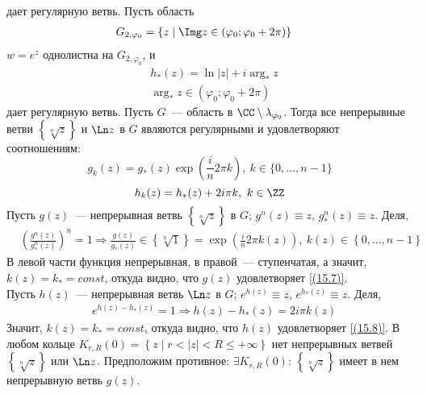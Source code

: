 дает регулярную ветвь.
Пусть область
\begin{align*}
  & G_{2, \varphi_0} = \left\{ z \mid \Img z \in \left( \varphi_0; \varphi_0 + 2\pi \right) \right\}
\end{align*}
$w = e^z$ однолистна на $G_{2, \varphi_0}$, и
\begin{equation}\label{(15.6)}
    \begin{split}
        & h_*(z) = \ln\left| z \right| + i \arg_* z \\
        & \arg_* z \in \left( \varphi_0; \varphi_0+2\pi \right)
    \end{split}
\end{equation}
дает регулярную ветвь.
\lemma
Пусть $G$~--- область в $\CC \setminus \lambda_{\varphi_0}$. Тогда все
непрерывные ветви $\left\{ \sqrt[n]{z} \right\}$ и $\Ln z$ в $G$ являются
регулярными и удовлетворяют соотношениям:
\begin{equation}\label{(15.7)}
    g_k(z) = g_*(z) \exp\left( \frac{i}{n} 2 \pi k\right), \ k \in \{0, \dots, n-1\}
\end{equation}
\begin{equation}\label{(15.8)}
    h_k(z) = h_*(z) + 2i \pi k, \ k \in \ZZ
\end{equation}
\pr
Пусть $g(z)$~--- непрерывная ветвь $\left\{\sqrt[n]{z}\right\}$ в $G$; $g^n(z) \equiv
    z$, $g_*^n(z) \equiv z$. Деля,
    \begin{align*}
      & \left( \frac{g^n(z)}{g_*^n(z)} \right)^n = 1 \Rightarrow \frac{g(z)}{g_*(z)} \in \left\{ \sqrt[n]{1} \right\} = \exp \left( \frac{i}{n} 2 \pi k(z) \right), \ k(z) \in \left\{ 0, \dots, n-1 \right\}
    \end{align*}
В левой части функция непрерывная, в правой~--- ступенчатая, а значит, $k(z) =
k_* = const$, откуда видно, что $g(z)$ удовлетворяет \eqref{(15.7)}.
\\
Пусть $h(z)$~--- непрерывная ветвь $\Ln z$ в $G$; $e^{h(z)} \equiv z$,
$e^{h_*(z)} \equiv z$. Деля,
\begin{align*}
  & e^{h(z)-h_*(z)} = 1 \Rightarrow h(z) - h_*(z) = 2i\pi k(z)
\end{align*}
Значит, $k(z) = k_* = const$, откуда видно, что $h(z)$ удовлетворяет
\eqref{(15.8)}.
\lemma
В любом кольце $K_{r,R}(0) = \left\{ z \mid r < \left| z \right| < R \leq
    +\infty \right\}$ нет непрерывных ветвей $\left\{ \sqrt[n]{z} \right\}$ или
$\Ln z$.
\pr
Предположим противное: $\exists K_{r, R}(0)$: $\left\{ \sqrt[n]{z} \right\}$
имеет в нем непрерывную ветвь $g(z)$. 
\\
